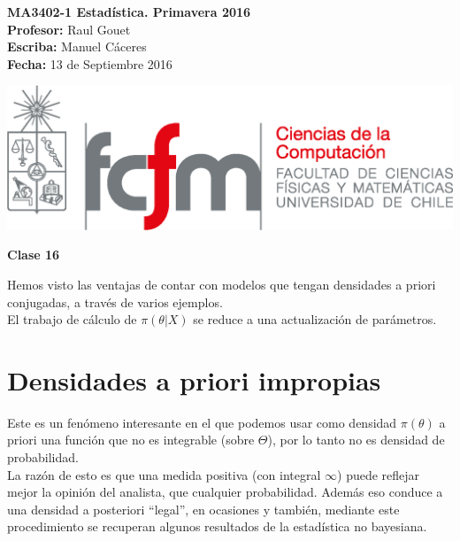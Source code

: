 \documentclass[10pt]{article}
\theoremstyle{plain}
\theoremstyle{definition}
\newcommand{\catnum}{16} %
\newcommand{\fecha}{13 de Septiembre 2016 }
\begin{document}
\vspace*{-1.2 cm}
\begin{minipage}{0.6\textwidth}
\begin{flushleft}
\hspace*{-0.5cm}\textbf{MA3402-1 Estadística. Primavera 2016}\\
\hspace*{-0.5cm}\textbf{Profesor:} Raul Gouet\\
\hspace*{-0.5cm}\textbf{Escriba:} Manuel Cáceres\\
\hspace*{-0.5cm}\textbf{Fecha:} \fecha
\end{flushleft}
\end{minipage}
\begin{minipage}{0.36\textwidth}
\begin{flushright}
\includegraphics[scale=0.3]{imagenes/fcfm_dcc}
\end{flushright}
\end{minipage}
\bigskip

\begin{center}
\LARGE\textbf{Clase \catnum}
\end{center}
Hemos visto las ventajas de contar con modelos que tengan densidades a priori conjugadas, a través de varios ejemplos.\\
El trabajo de cálculo de $\pi(\theta|X)$ se reduce a una actualización de parámetros.
\section{Densidades a priori impropias}
Este es un fenómeno interesante en el que podemos usar como densidad $\pi(\theta)$ a priori una función que no es integrable (sobre $\Theta$), por lo tanto no es densidad de probabilidad.\\

La razón de esto es que una medida positiva (con integral $\infty$) puede reflejar mejor la opinión del analista, que cualquier probabilidad. Además eso conduce a una densidad a posteriori ``legal'', en ocasiones y también, mediante este procedimiento se recuperan algunos resultados de la estadística no bayesiana.\\
\end{document}
